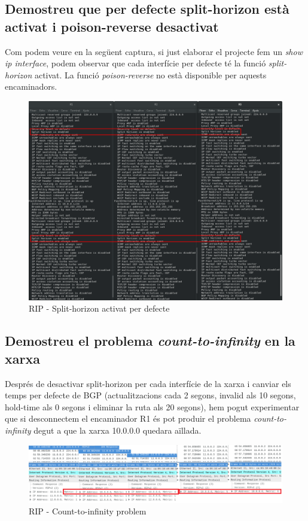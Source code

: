 \documentclass[10pt]{article}
\begin{document}
\subsection{Demostreu que per defecte split-horizon està activat i poison-reverse desactivat}
Com podem veure en la següent captura, si just elaborar el projecte fem un \textit{show ip interface}, podem observar que cada interfície per defecte té la funció \textit{split-horizon} activat. La funció \textit{poison-reverse} no està disponible per aquests encaminadors.
\begin{figure}[H]
\begin{center}
\includegraphics[scale=0.35]{Images/RIP-splithorizonenabled.png}
\caption{RIP - Split-horizon activat per defecte}
\end{center}
\end{figure}
\subsection{Demostreu el problema  	\textit{count-to-infinity} en la xarxa}
Després de desactivar split-horizon per cada interfície de la xarxa i canviar els temps per defecte de BGP (actualitzacions cada 2 segons, invalid als 10 segons, hold-time als 0 segons i eliminar la ruta als 20 segons), hem pogut experimentar que si desconnectem el encaminador R1 és pot produir el problema \textit{count-to-infinity} degut a que la xarxa 10.0.0.0 quedara aïllada.
\begin{figure}[H]
\begin{center}
\includegraphics[scale=0.45]{Images/RIP-infinity.png}
\caption{RIP - Count-to-infinity problem}
\end{center}
\end{figure}
\end{document}
